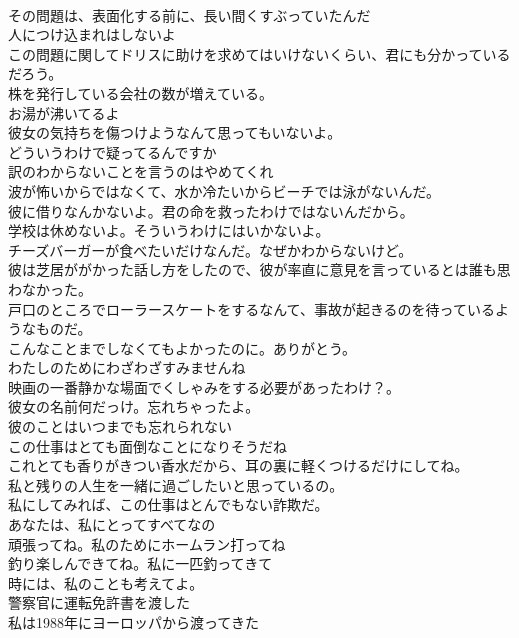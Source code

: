 \documentclass[8pt]{extreport}
\begin{document}
\begin{CJK}{UTF8}{min}
\\	その問題は、表面化する前に、長い間くすぶっていたんだ	
\\	人につけ込まれはしないよ	
\\	この問題に関してドリスに助けを求めてはいけないくらい、君にも分かっているだろう。	
\\	株を発行している会社の数が増えている。	
\\	お湯が沸いてるよ	
\\	彼女の気持ちを傷つけようなんて思ってもいないよ。	
\\	どういうわけで疑ってるんですか	
\\	訳のわからないことを言うのはやめてくれ	
\\	波が怖いからではなくて、水か冷たいからビーチでは泳がないんだ。	
\\	彼に借りなんかないよ。君の命を救ったわけではないんだから。	
\\	学校は休めないよ。そういうわけにはいかないよ。	
\\	チーズバーガーが食べたいだけなんだ。なぜかわからないけど。	
\\	彼は芝居ががかった話し方をしたので、彼が率直に意見を言っているとは誰も思わなかった。	
\\	戸口のところでローラースケートをするなんて、事故が起きるのを待っているようなものだ。	
\\	こんなことまでしなくてもよかったのに。ありがとう。	
\\	わたしのためにわざわざすみませんね	
\\	映画の一番静かな場面でくしゃみをする必要があったわけ？。	
\\	彼女の名前何だっけ。忘れちゃったよ。	
\\	彼のことはいつまでも忘れられない	
\\	この仕事はとても面倒なことになりそうだね	
\\	これとても香りがきつい香水だから、耳の裏に軽くつけるだけにしてね。	
\\	私と残りの人生を一緒に過ごしたいと思っているの。	
\\	私にしてみれば、この仕事はとんでもない詐欺だ。	
\\	あなたは、私にとってすべてなの	
\\	頑張ってね。私のためにホームラン打ってね	
\\	釣り楽しんできてね。私に一匹釣ってきて	
\\	時には、私のことも考えてよ。	
\\	警察官に運転免許書を渡した	
\\	私は1988年にヨーロッパから渡ってきた	

\end{CJK}
\end{document}

